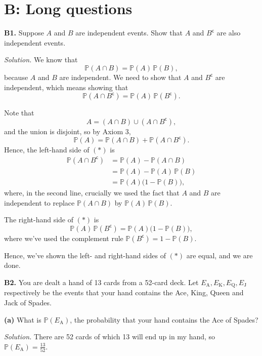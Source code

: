 \documentclass[
  a4paper,
]{book}
\theoremstyle{definition}
\theoremstyle{definition}
\theoremstyle{definition}
\theoremstyle{definition}
\theoremstyle{remark}
\begin{document}
\hypertarget{P3-long}{%
\section*{B: Long questions}\label{P3-long}}

\textbf{B1.} Suppose \(A\) and \(B\) are independent events. Show that \(A\) and \(B^\mathsf{c}\) are also independent events.

\begin{myanswers}
\emph{Solution.} We know that
\[ \mathbb P(A \cap B) = \mathbb P(A) \, \mathbb P(B) , \]
because \(A\) and \(B\) are independent.
We need to show that \(A\) and \(B^\mathsf{c}\) are independent, which means showing that
\[ \mathbb P(A \cap B^\mathsf{c}) = \mathbb P(A) \, \mathbb P(B^\mathsf{c}) . \tag{$*$} \]

Note that
\[ A = (A \cap B) \cup (A \cap B^\mathsf{c}) , \]
and the union is disjoint, so by Axiom 3,
\[ \mathbb P(A) = \mathbb P(A \cap B) + \mathbb P(A \cap B^\mathsf{c}) . \]
Hence, the left-hand side of \((*)\) is
\begin{align*}
\mathbb P(A \cap B^\mathsf{c})
&= \mathbb P(A) - \mathbb P(A \cap B) \\
&= \mathbb P(A) - \mathbb P(A)\,\mathbb P(B) \\
&= \mathbb P(A) \big(1 - \mathbb P(B)\big) ,
\end{align*}
where, in the second line, crucially we used the fact that \(A\) and \(B\) are independent to replace \(\mathbb P(A \cap B)\) by \(\mathbb P(A)\,\mathbb P(B)\).

The right-hand side of \((*)\) is
\[\mathbb P(A) \, \mathbb P(B^\mathsf{c}) = \mathbb P(A) \big(1 - \mathbb P(B)\big) , \]
where we've used the complement rule \(\mathbb P(B^\mathsf{c}) = 1- \mathbb P(B)\).

Hence, we've shown the left- and right-hand sides of \((*)\) are equal, and we are done.

\end{myanswers}

\textbf{B2.} You are dealt a hand of 13 cards from a 52-card deck. Let \(E_\mathrm{A}, E_\mathrm{K}, E_\mathrm{Q}, E_\mathrm{J}\) respectively be the events that your hand contains the Ace, King, Queen and Jack of Spades.

\textbf{(a)} What is \(\mathbb P(E_\mathrm{A})\), the probability that your hand contains the Ace of Spades?

\begin{myanswers}
\emph{Solution.} There are 52 cards of which 13 will end up in my hand, so \(\mathbb P(E_\mathrm{A}) = \frac{13}{52}\).

\end{myanswers}
\end{document}
